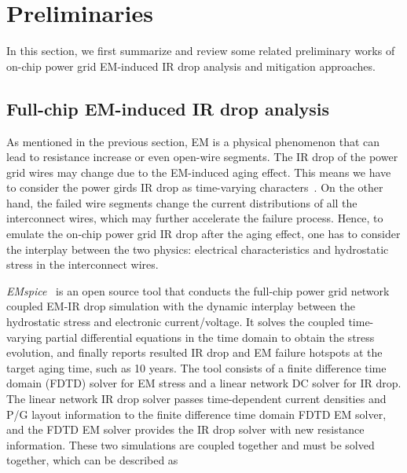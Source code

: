 \section{Preliminaries}
\label{sec:related}

In this section, we first summarize and review some related preliminary works of on-chip power grid EM-induced IR drop analysis and mitigation approaches.

\subsection{Full-chip EM-induced IR drop analysis}
\label{subsec:emspice}
As mentioned in the previous section, EM is a physical phenomenon that can lead to resistance increase or even open-wire segments.  The IR drop of the power grid wires may change due to the EM-induced aging effect. This means we have to consider the power girds IR drop as time-varying characters~\cite{SunYu:TDMR'20, Huang:TCAD'15, Chatterjee:2018TCAD,SukharevNajm:2018TDMR}. 
On the other hand, the failed wire segments change the current distributions of all the interconnect wires, which may further accelerate the failure process. Hence, to emulate the on-chip power grid IR drop after the aging effect, one has to consider the interplay between the two physics: electrical characteristics and hydrostatic stress in the interconnect wires.

{\it EMspice}~\cite{SunYu:TDMR'20,EMspiceSourceCode} is an open source tool that conducts the full-chip power grid network coupled EM-IR drop simulation with the dynamic interplay between the hydrostatic stress and electronic current/voltage. It solves the coupled time-varying partial differential equations in the time domain to obtain the stress evolution, and finally reports resulted IR drop and EM failure hotspots at the target aging time, such as 10 years.  The tool consists of a finite difference time domain (FDTD) solver for EM stress and a linear network DC solver for IR drop. The linear network IR drop solver passes time-dependent current densities and P/G layout information to the finite difference time domain FDTD EM solver, and the FDTD EM solver provides the IR drop solver with new resistance information. These two simulations are coupled together and must be solved together, which can be described as


